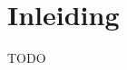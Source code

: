 \documentclass[lineaire_algebra_oplossingen.tex]{subfiles}
\begin{document}
\newpage
\section*{Inleiding}
TODO
\end{document}
